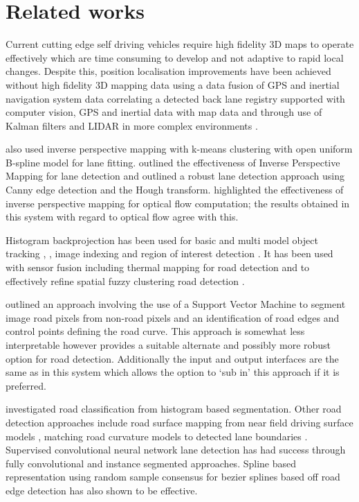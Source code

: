 \documentclass[]{aiaa-tc}%
\begin{document}
\section{Related works}

Current cutting edge self driving vehicles require high fidelity 3D maps to operate effectively which are time consuming to develop and not adaptive to rapid local changes. Despite this, position localisation improvements have been achieved without high fidelity 3D mapping data using a data fusion of GPS and inertial navigation system data \citep{gpsInsFusion} correlating a detected back lane registry supported with computer vision, GPS and inertial data with map data \citep{lowCostSensorNav} and through use of Kalman filters and LIDAR in more complex environments \citep{robotLIDARSLAM}.


\citet{ipmBasedLaneDetectionApproach} also used inverse perspective mapping with k-means clustering with open uniform B-spline model for lane fitting. \citet{ipmForLaneTracking} outlined the effectiveness of Inverse Perspective Mapping for lane detection and \citet{canneyAndHoughLanes} outlined a robust lane detection approach using Canny edge detection and the Hough transform. \citet{ipmOpticalFlow} highlighted the effectiveness of inverse perspective mapping for optical flow computation; the results obtained in this system with regard to optical flow agree with this.


Histogram backprojection has been used for basic \citep{histBackObjectTracking} and multi model object tracking \citep{histBackMultiObjectTrack}, \citep{histBackObjectMultiLighting}, image indexing \citep{histBackImageIndexing} and region of interest detection \citep{histBackObjectOfInterestDetection}. It has been used with sensor fusion including thermal mapping for road detection \citep{histBackThermal} and to effectively refine spatial fuzzy clustering road detection \citep{histBackRefineShadows}.

\citet{moncularLaneDetectAndTrack} outlined an approach involving the use of a Support Vector Machine to segment image road pixels from non-road pixels and an identification of road edges and control points defining the road curve. This approach is somewhat less interpretable however provides a suitable alternate and possibly more robust option for road detection. Additionally the input and output interfaces are the same as in this system which allows the option to `sub in' this approach if it is preferred. 

\citet{histogramSegmentationRoadClassification} investigated road classification from histogram based segmentation. Other road detection approaches include road surface mapping from near field driving surface models \citep{darpaChallengeRoadDetection}, matching road curvature models to detected lane boundaries \citep{intersectionDetectionSingleCamera}. Supervised convolutional neural network lane detection has had success through fully convolutional \citep{cnnLanes1} and instance segmented \citep{cnnLanes2} approaches. Spline based representation using random sample consensus for bezier splines based off road edge detection \citep{ransicBezierFit} has also shown to be effective.
\end{document}
